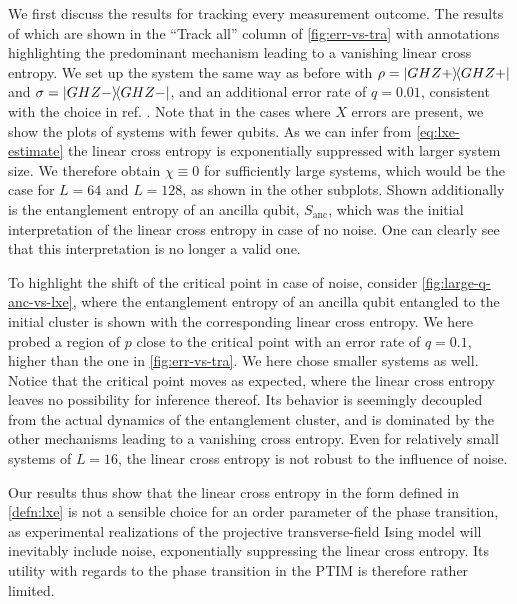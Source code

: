 We first discuss the results for tracking every measurement outcome. The
results of which are shown in the \enquote{Track all} column of
\cref{fig:err-vs-tra} with annotations highlighting the predominant mechanism
leading to a vanishing linear cross entropy. We set up the system the same way
as before with $\rho = \dyad{GHZ+}$ and $\sigma = \dyad{GHZ-}$, and an
additional error rate of $q=0.01$, consistent with the choice in ref.
\cite{tikhanovskayaUniversalityCrossEntropy2023}.
Note that in the cases where $X$
errors are present, we show the plots of systems with fewer qubits. As we can infer from
\cref{eq:lxe-estimate} the linear cross entropy is exponentially suppressed
with larger system size. We therefore obtain $\chi \equiv 0$ for sufficiently
large systems, which would be the case for $L=64$ and $L=128$, as shown in the
other subplots. Shown additionally is the entanglement entropy of an ancilla
qubit, $S_\mathrm{anc}$, which was the initial interpretation of the linear
cross entropy in case of no noise. One can clearly see that this interpretation
is no longer a valid one. 

To highlight the shift of the critical point in case
of noise, consider \cref{fig:large-q-anc-vs-lxe}, where the entanglement
entropy of an ancilla qubit entangled to the initial cluster is shown with 
the corresponding linear cross entropy. We here probed a region of $p$ close to
the critical point with an error rate of $q=0.1$, higher than the one in
\cref{fig:err-vs-tra}. We here chose smaller systems as well. Notice that the
critical point moves as expected, where the linear cross entropy leaves no
possibility for inference thereof. Its behavior is seemingly decoupled from the
actual dynamics of the entanglement cluster, and is dominated by the other
mechanisms leading to a vanishing cross entropy. Even for relatively small
systems of $L=16$, the linear cross entropy is not robust to the influence of
noise.

Our results thus show that the linear cross entropy in the form defined in
\cref{defn:lxe} is not a sensible choice for an order parameter of the phase
transition, as experimental realizations of the projective transverse-field
Ising model will inevitably include noise, exponentially suppressing the linear
cross entropy. Its utility with regards to the phase transition in the PTIM is
therefore rather limited.

